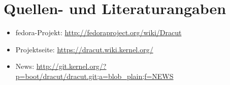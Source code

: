 \documentclass[10pt,a4paper]{article}
\begin{document}
\section{Quellen- und Literaturangaben}
\label{sec:quell}

\begin{itemize}
 \item fedora-Projekt: \url{http://fedoraproject.org/wiki/Dracut}
 \item Projektseite: \url{https://dracut.wiki.kernel.org/}
 \item News: \url{http://git.kernel.org/?p=boot/dracut/dracut.git;a=blob_plain;f=NEWS}
\end{itemize}
\end{document}
